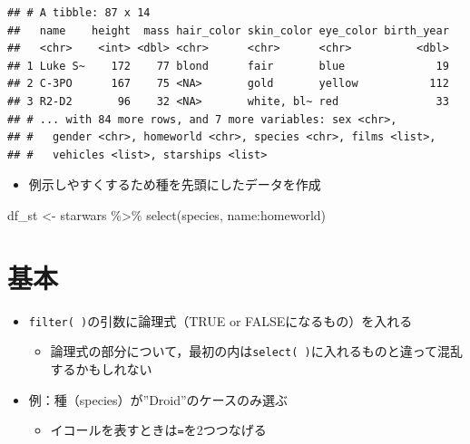 \documentclass[
  xelatex,ja=standard, b5paper]{bxjsbook}
\newenvironment{Shaded}{\begin{snugshade}}{\end{snugshade}}
\newcommand{\FunctionTok}[1]{\textcolor[rgb]{0.00,0.00,0.00}{#1}}
\newcommand{\NormalTok}[1]{#1}
\newcommand{\OtherTok}[1]{\textcolor[rgb]{0.56,0.35,0.01}{#1}}
\newcommand{\SpecialCharTok}[1]{\textcolor[rgb]{0.00,0.00,0.00}{#1}}
\providecommand{\tightlist}{%
  \setlength{\itemsep}{0pt}\setlength{\parskip}{0pt}}
\begin{document}
\begin{verbatim}
## # A tibble: 87 x 14
##   name    height  mass hair_color skin_color eye_color birth_year
##   <chr>    <int> <dbl> <chr>      <chr>      <chr>          <dbl>
## 1 Luke S~    172    77 blond      fair       blue              19
## 2 C-3PO      167    75 <NA>       gold       yellow           112
## 3 R2-D2       96    32 <NA>       white, bl~ red               33
## # ... with 84 more rows, and 7 more variables: sex <chr>,
## #   gender <chr>, homeworld <chr>, species <chr>, films <list>,
## #   vehicles <list>, starships <list>
\end{verbatim}

\begin{itemize}
\tightlist
\item
  例示しやすくするため種を先頭にしたデータを作成
\end{itemize}

\begin{Shaded}
\begin{Highlighting}[]
\NormalTok{df\_st }\OtherTok{\textless{}{-}} 
\NormalTok{  starwars }\SpecialCharTok{\%\textgreater{}\%} 
  \FunctionTok{select}\NormalTok{(species, name}\SpecialCharTok{:}\NormalTok{homeworld)}
\end{Highlighting}
\end{Shaded}

\hypertarget{filter-st}{%
\section{基本}\label{filter-st}}

\begin{itemize}
\tightlist
\item
  \texttt{filter(\ )}の引数に論理式（TRUE or FALSEになるもの）を入れる

  \begin{itemize}
  \tightlist
  \item
    論理式の部分について，最初の内は\texttt{select(\ )}に入れるものと違って混乱するかもしれない
  \end{itemize}
\item
  例：種（species）が''Droid''のケースのみ選ぶ

  \begin{itemize}
  \tightlist
  \item
    イコールを表すときは\texttt{=}を2つつなげる
  \end{itemize}
\end{itemize}
\end{document}
